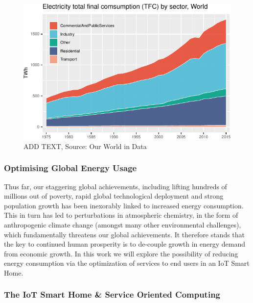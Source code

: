 \documentclass[11pt,]{article}
\begin{document}
\begin{figure}[H]

{\centering \includegraphics{MD_Final_files/figure-latex/sectorEnergyPlot-1} 

}

\caption{ADD TEXT, Source: Our World in Data}\label{fig:sectorEnergyPlot}
\end{figure}

\hypertarget{optimising-global-energy-usage}{%
\subsubsection{Optimising Global Energy
Usage}\label{optimising-global-energy-usage}}

Thus far, our staggering global achievements, including lifting hundreds
of millions out of poverty, rapid global technological deployment and
strong population growth has been inexorably linked to increased energy
consumption. This in turn has led to perturbations in atmospheric
chemistry, in the form of anthropogenic climate change (amongst many
other environmental challenges), which fundamentally threatens our
global achievements. It therefore stands that the key to continued human
prosperity is to de-couple growth in energy demand from economic growth.
In this work we will explore the possibility of reducing energy
consumption via the optimization of services to end users in an IoT
Smart Home.

\hypertarget{the-iot-smart-home-service-oriented-computing}{%
\subsubsection{The IoT Smart Home \& Service Oriented
Computing}\label{the-iot-smart-home-service-oriented-computing}}
\end{document}
